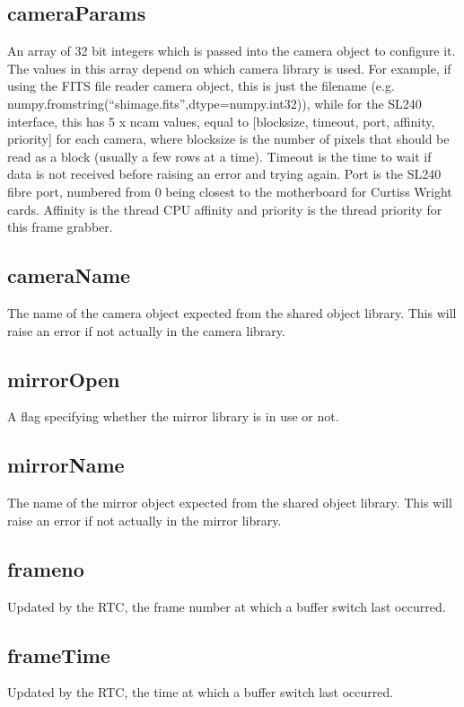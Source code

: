 \documentclass[a4,10pt]{article}
\begin{document}
\subsection{cameraParams}
An array of 32 bit integers which is passed into the camera object to
configure it.  The values in this array depend on which camera library
is used.  For example, if using the FITS file reader camera object,
this is just the filename
(e.g. numpy.fromstring(``shimage.fits'',dtype=numpy.int32)), while for
the SL240 interface, this has 5 x ncam values, equal to [blocksize,
timeout, port, affinity, priority] for each camera, where blocksize is
the number of pixels that should be read as a block (usually a few
rows at a time).  Timeout is the time to wait if data is not received
before raising an error and trying again.  Port is the SL240 fibre
port, numbered from 0 being closest to the motherboard for Curtiss
Wright cards.  Affinity is the thread CPU affinity and priority is the
thread priority for this frame grabber.

\subsection{cameraName}
The name of the camera object expected from the shared object library.
This will raise an error if not actually in the camera library.

\subsection{mirrorOpen}
A flag specifying whether the mirror library is in use or not.

\subsection{mirrorName}
The name of the mirror object expected from the shared object library.
This will raise an error if not actually in the mirror library.

\subsection{frameno}
Updated by the RTC, the frame number at which a buffer switch last
occurred.

\subsection{frameTime}
Updated by the RTC, the time at which a buffer switch last occurred.
\end{document}
